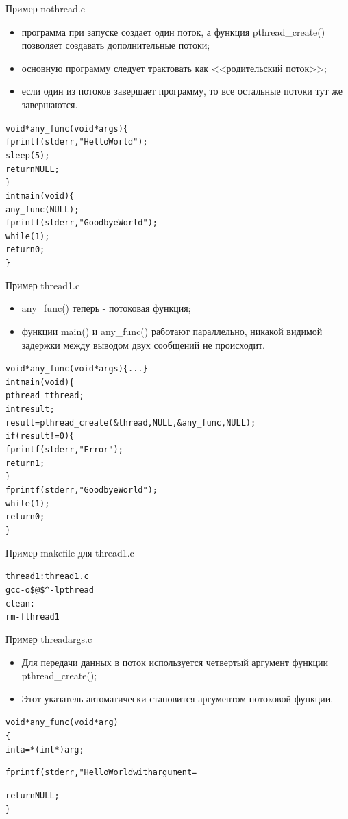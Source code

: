 \documentclass{beamer}
\begin{document}
\begin{frame}[fragile]{Пример nothread.c}
\begin{itemize}
\item программа при запуске создает один поток, а функция pthread\_create() позволяет создавать дополнительные потоки;
\item основную программу следует трактовать как <<родительский поток>>;
\item если один из потоков завершает программу, то все остальные потоки тут же завершаются.
\end{itemize}
\begin{alltt}
void * any_func (void * args) \{
  fprintf (stderr, "Hello World");
  sleep (5);
  return NULL;
\}
int main (void)\{
  any_func (NULL);
  fprintf (stderr, "Goodbye World");
  while (1);
  return 0;
\}
\end{alltt}
\end{frame}

\begin{frame}[fragile]{Пример thread1.c}
\begin{itemize}
\item any\_func() теперь - потоковая функция;
\item функции main() и any\_func() работают параллельно, никакой видимой задержки между выводом двух сообщений не происходит.
\end{itemize}
\begin{alltt}
void * any_func (void * args) \{...\}
int main (void)\{
  pthread_t thread;
  int result;
  result = pthread_create(&thread, NULL, &any_func, NULL);
  if (result != 0) \{
     fprintf (stderr, "Error");
     return 1;
  \}
  fprintf (stderr, "Goodbye World");
  while (1);
  return 0;
\}
\end{alltt}
\end{frame}

\begin{frame}[fragile]{Пример makefile для thread1.c}
\begin{alltt}
thread1: thread1.c
        gcc -o \$@ \$^ -lpthread
clean:
        rm -f thread1
\end{alltt}
\end{frame}

\begin{frame}[fragile]{Пример threadargs.c}
\begin{itemize}
\item Для передачи данных в поток используется четвертый аргумент функции pthread\_create();
\item Этот указатель автоматически становится аргументом потоковой функции.
\end{itemize}
\begin{alltt}
void * any_func (void * arg)
\{
    int a = *(int*) arg;
 
    fprintf (stderr, "Hello World with argument=%

    return NULL;
\}
\end{alltt}
\end{frame}
\end{document}
